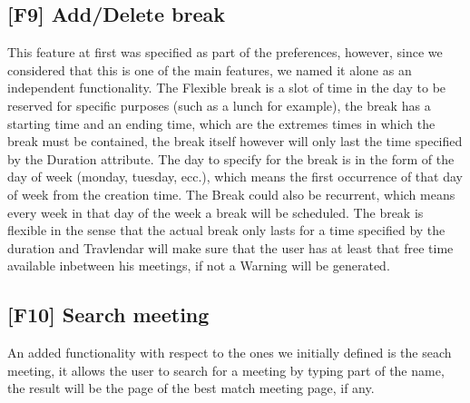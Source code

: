 \subsection{[F9] Add/Delete break}
This feature at first was specified as part of the preferences, however, since we considered that this is one of the main features, we named it alone as an independent functionality. The Flexible break is a slot of time in the day to be reserved for specific purposes (such as a lunch for example), the break has a starting time and an ending time, which are the extremes times in which the break must be contained, the break itself however will only last the time specified by the Duration attribute. The day to specify for the break is in the form of the day of week (monday, tuesday, ecc.), which means the first occurrence of that day of week from the creation time. The Break could also be recurrent, which means every week in that day of the week a break will be scheduled. The break is flexible in the sense that the actual break only lasts for a time specified by the duration and Travlendar will make sure that the user has at least that free time available inbetween his meetings, if not a Warning will be generated.

\subsection{[F10] Search meeting}
An added functionality with respect to the ones we initially defined is the seach meeting, it allows the user to search for a meeting by typing part of the name, the result will be the page of the best match meeting page, if any.



 

